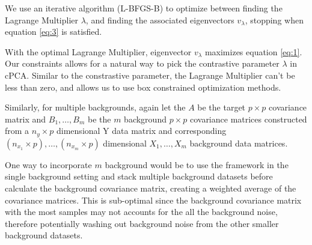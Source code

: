 \documentclass[12pt]{article}
\begin{document}
 We use an iterative algorithm (L-BFGS-B) \cite{byrd1995limited} to optimize between finding the Lagrange Multiplier $\lambda$, and finding the associated eigenvectors $v_\lambda$, stopping when equation \ref{eq:3} is satisfied.



With the optimal Lagrange Multiplier, eigenvector $v_\lambda$ maximizes equation \ref{eq:1}.
Our constraints allows for a natural way to pick the contrastive parameter $\lambda$ in cPCA. Similar to the constrastive parameter, the Lagrange Multiplier can't be less than zero, and allows us to use box constrained optimization methods. 





Similarly, for multiple backgrounds, again let the $A$ be the target $p \times p$ covariance matrix and $ B_1, \ldots, B_m$ be the $m$ background $p \times p$ covariance matrices constructed from a $n_y \times p$ dimensional Y data matrix and corresponding $(n_{x_1} \times p), \ldots, (n_{x_m}\times p)$ dimensional $X_1, \ldots, X_m$ background data matrices.

One way to incorporate $m$ background would be to use the framework in the single background setting and stack multiple background datasets before calculate the background covariance matrix, creating a weighted average of the covariance matrices. This is sub-optimal since the background covariance matrix with the most samples may not accounts for the all the background noise, therefore potentially washing out background noise from the other smaller background datasets. 
\end{document}
